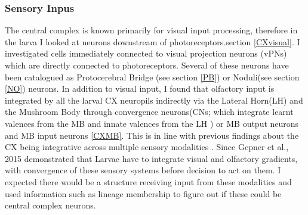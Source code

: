      \subsubsection{Sensory Inpus} 
    The central complex is known primarily for visual input processing, therefore in the larva I looked at neurons downstream of photoreceptors.section \ref{CXvisual}. I investigated cells immediately connected to visual projection neurons (vPNs) which are directly connected to photoreceptors. Several of these neurons have been catalogued as Protocerebral Bridge (see section \ref{PB}) or Noduli(see section \ref{NO}) neurons. 
    In addition to visual input, I found that olfactory input is integrated by all the larval CX neuropils indirectly via the Lateral Horn(LH) and the Mushroom Body through convergence neurons(CNs; which integrate learnt valences from the MB and innate valences from the LH \citep{eschbach2021circuits}) or MB output neurons and MB input neurons \ref{CXMB}. This is in line with previous findings about the CX being integrative across multiple sensory modalities \citep{hulse2021connectome}. Since Gepner et al., 2015 demonstrated that Larvae  have to integrate visual and olfactory gradients, with convergence of these sensory systems before decision to act on them. I expected there would be a structure receiving input from these modalities and used information such as lineage membership to figure out if these could be central complex neurons. 

